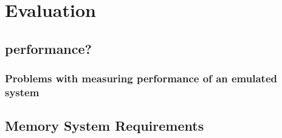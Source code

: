 \chapter{Evaluation}

\label{chap:eval}

\section{performance?}
\subsection{Problems with measuring performance of an emulated system}

\section{Memory System Requirements}
\cite{jacobSoftwaremanagedAddressTranslation1997}

